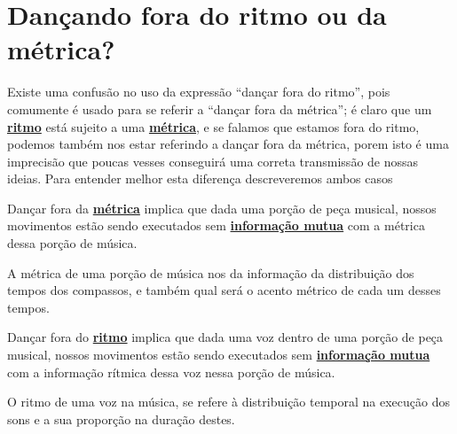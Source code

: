 
\newpage
\section{Dançando fora do ritmo ou da métrica?}

Existe uma confusão no uso da expressão ``dançar fora do ritmo'',
pois comumente é usado para se referir a ``dançar fora da métrica'';
é claro que um \hyperref[sec:pos:Ritmo]{\textbf{ritmo}} está sujeito a uma \hyperref[def:Metrica]{\textbf{métrica}}, 
e se falamos que estamos fora do ritmo,
podemos também nos estar referindo a  dançar fora da métrica, 
porem isto é uma imprecisão que poucas vesses conseguirá
uma correta transmissão de nossas ideias.
Para entender melhor esta diferença descreveremos ambos casos


\begin{definition}
Dançar fora da \hyperref[def:Metrica]{\textbf{métrica}}
 implica que dada uma porção de peça musical,
nossos movimentos estão sendo executados sem 
\hyperref[sec:musicalidadeinfmutua]{\textbf{informação mutua}} com a métrica
dessa porção de música.

A métrica de uma porção de música nos da informação da distribuição
dos tempos dos compassos, e também qual será o acento métrico de cada um desses tempos.
\end{definition}

\begin{definition}
\label{def:fora-do-ritmo}
Dançar fora do \hyperref[sec:pos:Ritmo]{\textbf{ritmo}}
implica que dada uma voz dentro de uma porção de peça musical,
nossos movimentos estão sendo executados sem 
\hyperref[sec:musicalidadeinfmutua]{\textbf{informação mutua}} com a 
informação rítmica dessa voz nessa porção de música.

O ritmo de uma voz na música, 
se refere à distribuição temporal na execução dos sons e a sua proporção na duração
destes.
\end{definition}

